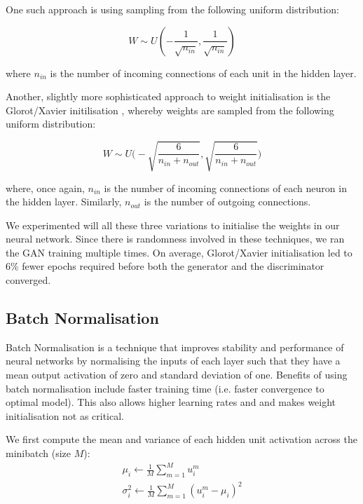 One such approach is using sampling from the following uniform distribution:

\begin{equation}
 W \sim U(-\frac{1}{\sqrt{n_{in}}}, \frac{1}{\sqrt{n_{in}}})
\end{equation}

where $n_{in}$ is the number of incoming connections of each unit in the hidden layer.

Another, slightly more sophisticated approach to weight initialisation is the Glorot/Xavier initilisation \citep{pmlr-v9-glorot10a}, whereby weights are sampled from the following uniform distribution:

\begin{equation}
W \sim U\Bigg(-\sqrt{\frac{6}{n_{in}+n_{out}}}, \sqrt{\frac{6}{n_{in}+n_{out}}}\Bigg)
\end{equation}

where, once again, $n_{in}$ is the number of incoming connections of each neuron in the hidden layer. Similarly, $n_{out}$ is the number of outgoing connections.

We experimented will all these three variations to initialise the weights in our neural network. Since there is randomness involved in these techniques, we ran the GAN training multiple times. On average, Glorot/Xavier initialisation led to 6\% fewer epochs required before both the generator and the discriminator converged.

\subsection{Batch Normalisation}
Batch Normalisation \citep{DBLP:journals/corr/IoffeS15} is a technique that improves stability and performance of neural networks by normalising the inputs of each layer such that they have a mean output activation of zero and standard deviation of one. Benefits of using batch normalisation include faster training time (i.e. faster convergence to optimal model). This also allows higher learning rates and and makes weight initialisation not as critical.

We first compute the mean and variance of each hidden unit activation across the minibatch (size $M$):
\begin{gather*}
\mu_i \leftarrow \frac{1}{M} \sum_{m=1}^{M}u_i^m \\
\sigma_i^2 \leftarrow \frac{1}{M} \sum_{m=1}^{M}(u_i^m - \mu_i)^2
\end{gather*}

